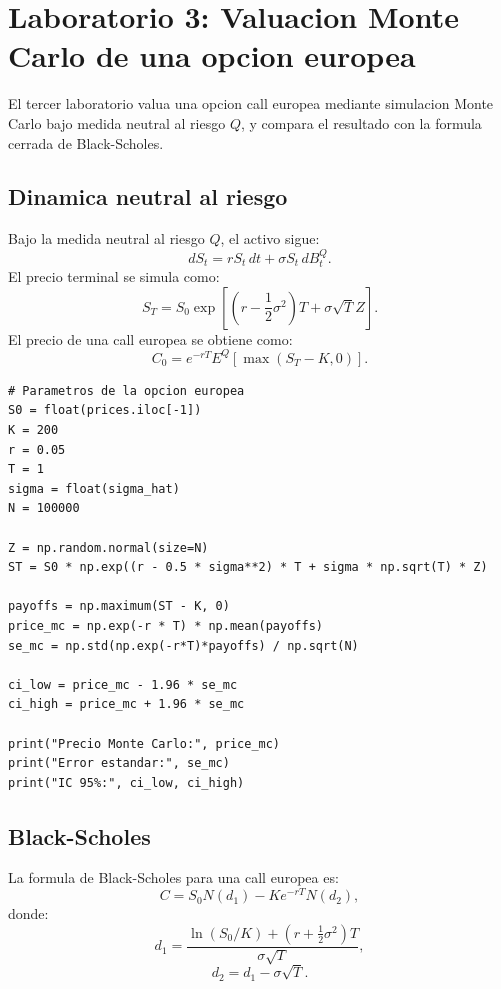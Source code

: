 \documentclass[12pt,a4paper]{article}
\begin{document}
\section{Laboratorio 3: Valuacion Monte Carlo de una opcion europea}

\begin{markdowncell}
El tercer laboratorio valua una opcion call europea mediante simulacion Monte Carlo bajo medida neutral al riesgo \(Q\), y compara el resultado con la formula cerrada de Black-Scholes.
\end{markdowncell}

\subsection{Dinamica neutral al riesgo}

\begin{latexcell}
Bajo la medida neutral al riesgo \(Q\), el activo sigue:
\[
dS_t = rS_t\,dt+\sigma S_t\,dB_t^Q.
\]
El precio terminal se simula como:
\[
S_T = S_0\exp\left[
\left(r-\frac{1}{2}\sigma^2\right)T+\sigma\sqrt{T}Z
\right].
\]
El precio de una call europea se obtiene como:
\[
C_0 = e^{-rT}E^Q[\max(S_T-K,0)].
\]
\end{latexcell}

\begin{lstlisting}[style=pythonstyle]
# Parametros de la opcion europea
S0 = float(prices.iloc[-1])
K = 200
r = 0.05
T = 1
sigma = float(sigma_hat)
N = 100000

Z = np.random.normal(size=N)
ST = S0 * np.exp((r - 0.5 * sigma**2) * T + sigma * np.sqrt(T) * Z)

payoffs = np.maximum(ST - K, 0)
price_mc = np.exp(-r * T) * np.mean(payoffs)
se_mc = np.std(np.exp(-r*T)*payoffs) / np.sqrt(N)

ci_low = price_mc - 1.96 * se_mc
ci_high = price_mc + 1.96 * se_mc

print("Precio Monte Carlo:", price_mc)
print("Error estandar:", se_mc)
print("IC 95%:", ci_low, ci_high)
\end{lstlisting}

\subsection{Black-Scholes}

\begin{latexcell}
La formula de Black-Scholes para una call europea es:
\[
C = S_0N(d_1)-Ke^{-rT}N(d_2),
\]
donde:
\[
d_1=
\frac{\ln(S_0/K)+(r+\frac{1}{2}\sigma^2)T}{\sigma\sqrt{T}},
\]
\[
d_2=d_1-\sigma\sqrt{T}.
\]
\end{latexcell}
\end{document}
